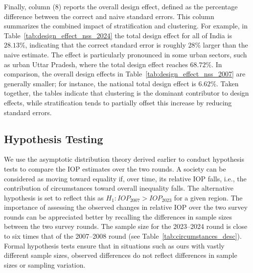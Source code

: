 \documentclass[12pt]{article}
\theoremstyle{plain}
\theoremstyle{definition}
\begin{document}
Finally, column (8) reports the overall design effect, defined as the percentage difference between the correct and naive standard errors. This column summarizes the combined impact of stratification and clustering. For example, in Table~\ref{tab:design_effect_nss_2024} the total design effect for all of India is $28.13\%$, indicating that the correct standard error is roughly 28\% larger than the naive estimate. The effect is particularly pronounced in some urban sectors, such as urban Uttar Pradesh, where the total design effect reaches $68.72\%$. In comparison, the overall design effects in Table~\ref{tab:design_effect_nss_2007} are generally smaller; for instance, the national total design effect is $6.62\%$. Taken together, the tables indicate that clustering is the dominant contributor to design effects, while stratification tends to partially offset this increase by reducing standard errors.

\begin{table}
    \centering\small
    \caption{Effect of complex household survey structure on standard errors of IOP: NSS 2007--2008}  
          
    \label{tab:design_effect_nss_2007}
\end{table}

\begin{table}
    \centering\small
    \caption{Effect of complex household survey structure on standard errors of IOP: NSS 2023--2024}
        
    \label{tab:design_effect_nss_2024}
\end{table}

\subsection{Hypothesis Testing}
\label{ssec:hyp_test}

We use the asymptotic distribution theory derived earlier to conduct hypothesis tests to compare the IOP estimates over the two rounds. A society can be considered as moving toward equality if, over time, its relative IOP falls, i.e., the contribution of circumstances toward overall inequality falls. The alternative hypothesis is set to reflect this as
$ H_{1}: IOP_{2007} > IOP_{2023} $ for a given region. The importance of assessing the observed changes in relative IOP over the two survey rounds can be appreciated better by recalling the differences in sample sizes between the two survey rounds. The sample size for the 2023--2024 round is close to six times that of the 2007--2008 round (see Table~\ref{tab:circumstances_desc}). Formal hypothesis tests ensure that in situations such as ours with vastly different sample sizes, observed differences do not reflect differences in sample sizes or sampling variation.
\end{document}
